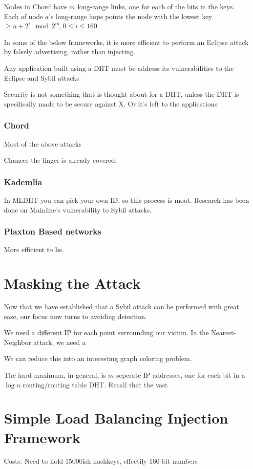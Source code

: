 \documentclass[a4paper]{article}
\begin{document}
Nodes in Chord have $m$ long-range links, one for each of the bits in the keys.
Each of node $a$'s long-range hops points the node with the lowest key $\geq a + 2^{i} \mod 2^{m} , 0 \leq i \leq 160$.


In some of the below frameworks, it is more efficient to perform an Eclipse attack by falsely advertising, rather than injecting.






Any application built using a DHT must be address its vulnerabilities to the Eclipse and Sybil attacks

Security is not something that is thought about for a DHT, unless the 
DHT is specifically made to be secure against X.  
Or it's left to the applications



\subsubsection{Chord}
Most of the above attacks



Chances the finger is already covered:

\subsubsection{Kademlia}
In MLDHT you can pick your own ID, so this process is moot.
Research has been done on Mainline's  vulnerability to Sybil attacks.

\subsubsection{Plaxton Based networks}
More efficient to lie.


\section{Masking the Attack}
Now that we have established that a Sybil attack can be performed with great ease, our focus now turns to avoiding detection.

We need a different IP for each point surrounding our victim.  In the Nearest-Neighbor attack, we need a 

We can reduce this into an interesting graph coloring problem.


The hard maximum, in general, is $m$ seperate IP addresses, one for each bit in a $\log n$ routing/routing table DHT.
Recall that the vast


\section{Simple Load Balancing Injection Framework}

Costs:  Need to hold 15000ish hashkeys, effectily 160-bit numbers



\end{document}
